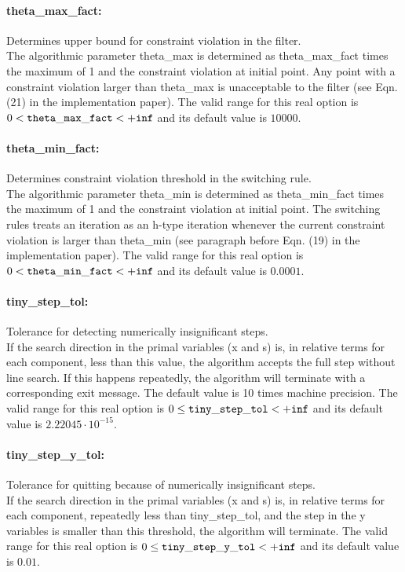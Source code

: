 \paragraph{theta\_max\_fact:}\label{opt:theta_max_fact} Determines upper bound for constraint violation in the filter. \\
 The algorithmic parameter theta\_max is determined as theta\_max\_fact times the maximum of 1 and the constraint violation at initial point.  Any point with a constraint violation larger than theta\_max is unacceptable to the filter (see Eqn. (21) in the implementation paper). The valid range for this real option is 
$0 <  {\tt theta\_max\_fact } <  {\tt +inf}$
and its default value is $10000$.


\paragraph{theta\_min\_fact:}\label{opt:theta_min_fact} Determines constraint violation threshold in the switching rule. \\
 The algorithmic parameter theta\_min is determined as theta\_min\_fact times the maximum of 1 and the constraint violation at initial point.  The switching rules treats an iteration as an h-type iteration whenever the current constraint violation is larger than theta\_min (see paragraph before Eqn. (19) in the implementation paper). The valid range for this real option is 
$0 <  {\tt theta\_min\_fact } <  {\tt +inf}$
and its default value is $0.0001$.


\paragraph{tiny\_step\_tol:}\label{opt:tiny_step_tol} Tolerance for detecting numerically insignificant steps. \\
 If the search direction in the primal variables (x and s) is, in relative terms for each component, less than this value, the algorithm accepts the full step without line search.  If this happens repeatedly, the algorithm will terminate with a corresponding exit message. The default value is 10 times machine precision. The valid range for this real option is 
$0 \le {\tt tiny\_step\_tol } <  {\tt +inf}$
and its default value is $2.22045 \cdot 10^{-15}$.


\paragraph{tiny\_step\_y\_tol:}\label{opt:tiny_step_y_tol} Tolerance for quitting because of numerically insignificant steps. \\
 If the search direction in the primal variables (x and s) is, in relative terms for each component, repeatedly less than tiny\_step\_tol, and the step in the y variables is smaller than this threshold, the algorithm will terminate. The valid range for this real option is 
$0 \le {\tt tiny\_step\_y\_tol } <  {\tt +inf}$
and its default value is $0.01$.


